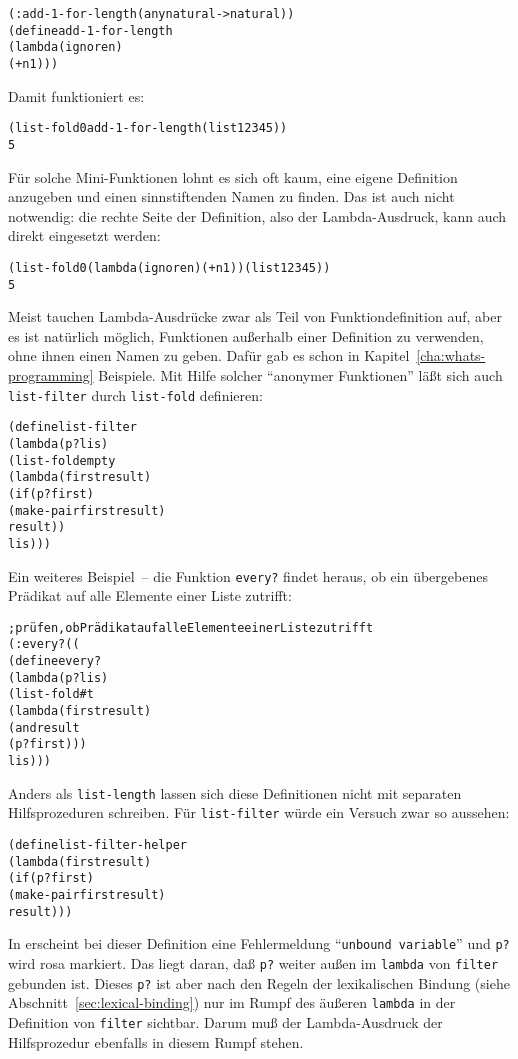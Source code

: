 \begin{alltt}
(: add-1-for-length (any natural -> natural))
(define add-1-for-length
  (lambda (ignore n)
    (+ n 1)))
\end{alltt}
%
Damit funktioniert es:
%
\begin{alltt}
(list-fold 0 add-1-for-length (list 1 2 3 4 5))
\evalsto{} 5
\end{alltt}
%
Für solche Mini-Funktionen lohnt es sich oft kaum, eine eigene
Definition anzugeben und einen sinnstiftenden Namen zu finden.  Das
ist auch nicht notwendig: die rechte Seite der Definition, also der
Lambda-Ausdruck, kann auch direkt eingesetzt werden:
%
\begin{alltt}
(list-fold 0 (lambda (ignore n) (+ n 1)) (list 1 2 3 4 5))
\evalsto{} 5
\end{alltt}
%
Meist tauchen Lambda-Ausdrücke zwar als Teil von Funktiondefinition
auf, aber es ist natürlich möglich, Funktionen außerhalb einer
Definition zu verwenden, ohne ihnen einen Namen zu geben.  Dafür gab
es schon in Kapitel~\ref{cha:whats-programming} Beispiele. Mit Hilfe
solcher "`anonymer Funktionen"' läßt sich auch \texttt{list-filter}
durch \texttt{list-fold} definieren:
%
\begin{alltt}
(define list-filter
  (lambda (p? lis)
    (list-fold empty
               (lambda (first result)
                 (if (p? first)
                     (make-pair first result)
                     result))
               lis)))
\end{alltt}
%
Ein weiteres Beispiel~-- die Funktion
\texttt{every?} findet heraus, ob ein
übergebenes Prädikat auf alle Elemente einer Liste zutrifft:
\label{page:every}
%
\begin{alltt}
; prüfen, ob Prädikat auf alle Elemente einer Liste zutrifft
(: every? ((%a -> boolean) (list-of %a) -> boolean))
(define every?
  (lambda (p? lis)
    (list-fold #t
               (lambda (first result)
                 (and result
                      (p? first)))
               lis)))
\end{alltt}
%
Anders als \texttt{list-length} lassen sich diese Definitionen
nicht mit separaten Hilfsprozeduren schreiben.  Für
\texttt{list-filter} würde ein Versuch zwar so aussehen:
%
\begin{alltt}
(define list-filter-helper
  (lambda (first result)
    (if (p? first)
        (make-pair first result)
        result)))
\end{alltt}
%
In \drscheme{} erscheint bei dieser Definition eine Fehlermeldung 
"`\texttt{unbound variable}"' und \texttt{p?} wird rosa markiert.  Das
liegt daran, daß \texttt{p?} weiter außen im \texttt{lambda} von
\texttt{filter} gebunden ist.  Dieses \texttt{p?} ist aber nach den
Regeln der lexikalischen Bindung (siehe
Abschnitt~\ref{sec:lexical-binding}) nur im Rumpf des äußeren
\texttt{lambda} in der Definition von \texttt{filter} sichtbar.  Darum
muß der Lambda-Ausdruck der Hilfsprozedur ebenfalls in diesem
Rumpf stehen.

